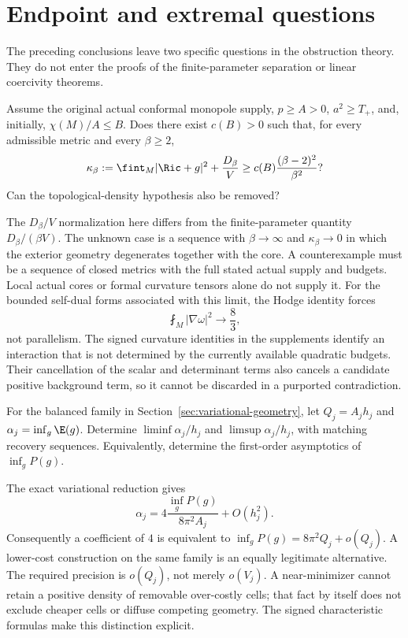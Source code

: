 \section{Endpoint and extremal questions}
\label{sec:open-problems}
The preceding conclusions leave two specific questions in the obstruction
theory. They do not enter the proofs of the finite-parameter separation or
linear coercivity theorems.

\begin{problem}
Assume the original actual conformal monopole supply, $p\ge A>0$,
$a^2\ge T_+$, and, initially, $\chi(M)/A\le B$. Does there exist
$c(B)>0$ such that, for every admissible metric and every $\beta\ge2$,
\[
 \kappa_\beta:=\fint_M|\Ric+g|^2+\frac{D_\beta}{V}
 \ge c(B)\frac{(\beta-2)^2}{\beta^2}?
\]
Can the topological-density hypothesis also be removed?
\end{problem}
The $D_\beta/V$ normalization here differs from the finite-parameter
quantity $D_\beta/(\beta V)$. The unknown case is a sequence with
$\beta\to\infty$ and $\kappa_\beta\to0$ in which the exterior geometry
degenerates together with the core. A counterexample must be a sequence
of closed metrics with the full stated actual supply and budgets.
Local actual cores or formal curvature tensors alone do not supply it.
For the bounded self-dual forms associated with this limit, the Hodge
identity forces
\[
 \fint_M|\nabla\omega|^2\longrightarrow\frac83,
\]
not parallelism. The signed curvature identities in the supplements
identify an interaction that is not determined by the currently available
quadratic budgets. Their cancellation of the scalar and determinant
terms also cancels a candidate positive background term, so it cannot
be discarded in a purported contradiction.

\begin{problem}
For the balanced family in Section~\ref{sec:variational-geometry}, let
$Q_j=A_jh_j$ and $\alpha_j=\inf_g\E(g)$. Determine
$\liminf\alpha_j/h_j$ and $\limsup\alpha_j/h_j$, with matching recovery
sequences. Equivalently, determine the first-order asymptotics of
$\inf_gP(g)$.
\end{problem}
The exact variational reduction gives
\[
 \alpha_j=4\frac{\inf_gP(g)}{8\pi^2A_j}+O(h_j^2).
\]
Consequently a coefficient of $4$ is equivalent to
$\inf_gP(g)=8\pi^2Q_j+o(Q_j)$. A lower-cost construction on the same
family is an equally legitimate alternative. The required precision is
$o(Q_j)$, not merely $o(V_j)$. A near-minimizer cannot retain a positive
density of removable over-costly cells; that fact by itself does not
exclude cheaper cells or diffuse competing geometry. The signed
characteristic formulas make this distinction explicit.

